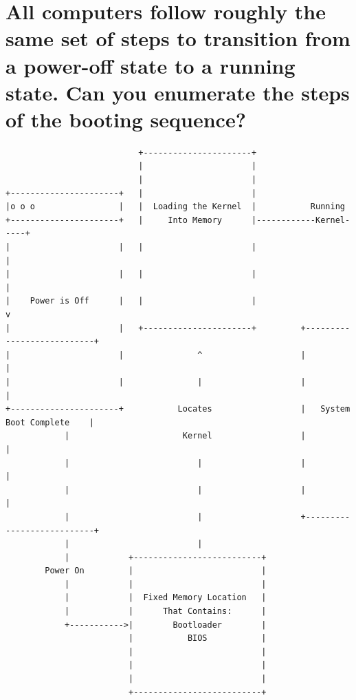 \documentclass{article}
\begin{document}
\section{All computers follow roughly the same set of steps to transition from a power-off state to a running state. Can you enumerate the steps of the booting sequence?}
\begin{verbatim}
                           +----------------------+                                      
                           |                      |                                      
                           |                      |                                      
+----------------------+   |                      |                                      
|o o o                 |   |  Loading the Kernel  |           Running                    
+----------------------+   |     Into Memory      |------------Kernel-----+              
|                      |   |                      |                       |              
|                      |   |                      |                       |              
|    Power is Off      |   |                      |                       v              
|                      |   +----------------------+         +---------------------------+
|                      |               ^                    |                           |
|                      |               |                    |                           |
+----------------------+           Locates                  |   System Boot Complete    |
            |                       Kernel                  |                           |
            |                          |                    |                           |
            |                          |                    |                           |
            |                          |                    +---------------------------+
            |                          |                                                 
            |            +--------------------------+                                    
        Power On         |                          |                                    
            |            |                          |                                    
            |            |  Fixed Memory Location   |                                    
            |            |      That Contains:      |                                    
            +----------->|        Bootloader        |                                    
                         |           BIOS           |                                    
                         |                          |                                    
                         |                          |                                    
                         |                          |                                    
                         +--------------------------+                                    
\end{verbatim}
\pagebreak
\end{document}
